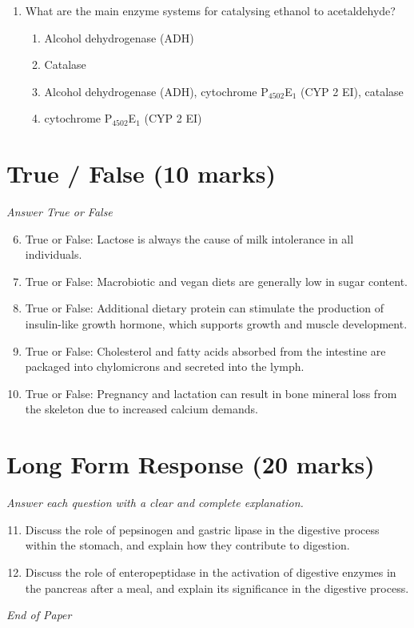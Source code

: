 \documentclass[12pt]{article}
\begin{document}
\begin{enumerate}[label=\arabic*.]
\begin{enumerate}[label=(\alph*)]
    \item A reduction in bone density
    \item An increased appetite
    \item Impaired immune function
\end{enumerate}
\item What are the main enzyme systems for catalysing ethanol to acetaldehyde?
\begin{enumerate}[label=(\alph*)]
    \item Alcohol dehydrogenase (ADH)
    \item Catalase
    \item Alcohol dehydrogenase (ADH), cytochrome P$_{4502}$E$_{1}$ (CYP 2 EI), catalase
    \item cytochrome P$_{4502}$E$_{1}$ (CYP 2 EI)
\end{enumerate}
\end{enumerate}

\section*{True / False (10 marks)}
\textit{Answer True or False}
\begin{enumerate}[label=\arabic*.]
\setcounter{enumi}{5}
\item True or False: Lactose is always the cause of milk intolerance in all individuals.
\item True or False: Macrobiotic and vegan diets are generally low in sugar content.
\item True or False: Additional dietary protein can stimulate the production of insulin-like growth hormone, which supports growth and muscle development.
\item True or False: Cholesterol and fatty acids absorbed from the intestine are packaged into chylomicrons and secreted into the lymph.
\item True or False: Pregnancy and lactation can result in bone mineral loss from the skeleton due to increased calcium demands.
\end{enumerate}

\section*{Long Form Response (20 marks)}
\textit{Answer each question with a clear and complete explanation.}
\begin{enumerate}[label=\arabic*.]
\setcounter{enumi}{10}
\item Discuss the role of pepsinogen and gastric lipase in the digestive process within the stomach, and explain how they contribute to digestion.
\item Discuss the role of enteropeptidase in the activation of digestive enzymes in the pancreas after a meal, and explain its significance in the digestive process.
\end{enumerate}

\vfill
\noindent\textit{End of Paper}
\end{document}
